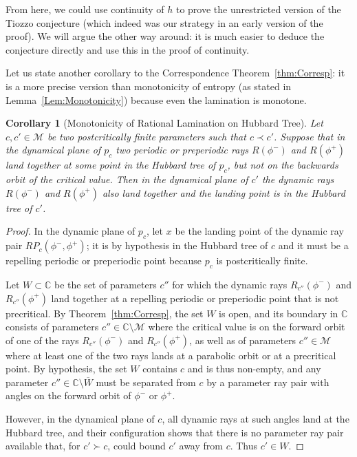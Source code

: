 \documentclass[12pt]{amsart}
\newcommand{\M}{\mathscr M}
\newcommand{\C}{\mathbb C}
\newcommand{\sm}{\setminus}
\newcommand{\0}{\texttt{0}}
\newcommand{\1}{\texttt{1}}
\newtheorem{corollary}[theorem]{Corollary}
\theoremstyle{definition}
\numberwithin{equation}{section}
\newcommand{\ovl}[1]{\overline{#1}}
\begin{document}
From here, we could use continuity of $h$ to prove the unrestricted version of the Tiozzo conjecture (which indeed was our strategy in an early version of the proof). We will argue the other way around: it is much easier to deduce the conjecture directly and use this in the proof of continuity.

Let us state another corollary to the Correspondence Theorem~\ref{thm:Corresp}: it is a more precise version than monotonicity of entropy (as stated in Lemma~\ref{Lem:Monotonicity}) because even the lamination is monotone.



\begin{corollary}[Monotonicity of Rational Lamination on Hubbard Tree]
\label{Cor:CountPartsHubTree}
Let $c,c'\in\M$ be two postcritically finite parameters such that $c\prec c'$. Suppose that in the dynamical plane of $p_c$ two periodic or preperiodic rays $R(\phi^-)$ and $R(\phi^+)$ land together at some point in the Hubbard tree of $p_c$, but not on the backwards orbit of the critical value. Then in the dynamical plane of $c'$ the dynamic rays $R(\phi^-)$ and $R(\phi^+)$ also land together and the landing point is in the Hubbard tree of $c'$.
\end{corollary}

\begin{proof}
In the dynamic plane of $p_c$, let $x$ be the landing point of the dynamic ray pair $RP_c(\phi^-,\phi^+)$;  it is by hypothesis in the Hubbard tree of $c$ and it must be a repelling periodic or preperiodic point because $p_c$ is postcritically finite.

Let $W\subset\C$ be the set of parameters $c''$ for which the dynamic rays $R_{c''}(\phi^-)$ and $R_{c''}(\phi^+)$ land together at a repelling periodic or preperiodic point that is not precritical. By Theorem~\ref{thm:Corresp}, the set $W$ is open, and its boundary in $\C$ consists of parameters $c''\in\C\sm\M$ where the critical value is on the forward orbit of one of the rays $R_{c''}(\phi^-)$ and $R_{c''}(\phi^+)$, as well as of parameters $c''\in\M$ where at least one of the two rays lands at a parabolic orbit or at a precritical point. By hypothesis, the set $W$ contains $c$ and is thus non-empty, and any parameter $c''\in\C\sm\ovl W$ must be separated from $c$ by a parameter ray pair with angles on the forward orbit of $\phi^-$ or $\phi^+$. 

However, in the dynamical plane of $c$, all dynamic rays at such angles land at the Hubbard tree, and their configuration shows that there is no parameter ray pair available that, for $c'\succ c$, could bound $c'$ away from $c$. Thus $c'\in W$. 
\end{proof}
\end{document}
